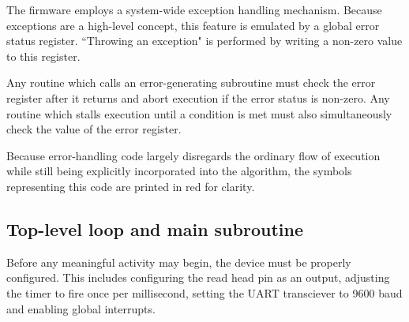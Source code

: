 \documentclass{article}
\begin{document}
	The firmware employs a system-wide exception handling mechanism. Because
	exceptions are a high-level concept, this feature is emulated by a global
	error status register. ``Throwing an exception" is performed by writing a
	non-zero value to this register.
	
	Any routine which calls an error-generating subroutine must check the error
	register after it returns and abort execution if the error status is
	non-zero. Any routine which stalls execution until a condition is met must
	also simultaneously check the value of the error register.
	
	Because error-handling code largely disregards the ordinary flow of
	execution while still being explicitly incorporated into the algorithm, the
	symbols representing this code are printed in red for clarity.
	
	\subsection{Top-level loop and main subroutine}
	
	Before any meaningful activity may begin, the device must be properly
	configured. This includes configuring the read head pin as an output,
	adjusting the timer to fire once per millisecond, setting the UART
	transciever to 9600 baud and enabling global interrupts.
	
\end{document}

